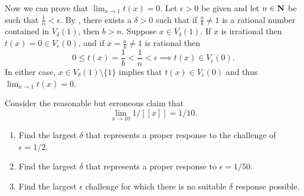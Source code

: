 \documentclass{lew98_solutions}
\begin{document}
\begin{solution}
\begin{enumerate}
        Now we can prove that \( \lim_{x \to 1} t(x) = 0 \). Let \( \epsilon > 0 \) be given and let \( n \in \mathbf{N} \) be such that \( \tfrac{1}{n} < \epsilon \). By , there exists a \( \delta > 0 \) such that if \( \tfrac{a}{b} \neq 1 \) is a rational number contained in \( V_{\delta}(1) \), then \( b > n \). Suppose \( x \in V_{\delta}(1) \). If \( x \) is irrational then \( t(x) = 0 \in V_{\epsilon}(0) \), and if \( x = \tfrac{a}{b} \neq 1 \) is rational then
        \[
            0 \leq t(x) = \frac{1}{b} < \frac{1}{n} < \epsilon \implies t(x) \in V_{\epsilon}(0).
        \]
        In either case, \( x \in V_{\delta}(1) \setminus \{ 1 \} \) implies that \( t(x) \in V_{\epsilon}(0) \) and thus \( \lim_{x \to 1} t(x) = 0 \).
    \end{enumerate}
\end{solution}

\begin{exercise}
\label{ex:4.2.4}
    Consider the reasonable but erroneous claim that
    \[
        \lim_{x \to 10} 1/[[x]] = 1/10.
    \]
    \begin{enumerate}
        \item Find the largest \( \delta \) that represents a proper response to the challenge of \( \epsilon = 1/2 \).

        \item Find the largest \( \delta \) that represents a proper response to \( \epsilon = 1/50 \).

        \item Find the largest \( \epsilon \) challenge for which there is no suitable \( \delta \) response possible.
    \end{enumerate}
\end{exercise}
\end{document}
